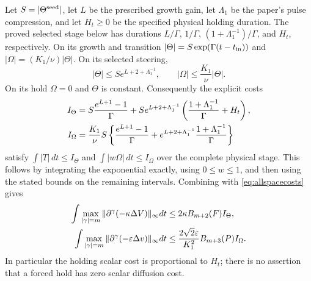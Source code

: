 Let $S=|\Theta^{\rm seed}|$, let $L$ be the prescribed growth gain,
let $\Lambda_1$ be the paper's pulse compression, and let $H_t\geq0$
be the specified physical holding duration. The proved selected stage
below has durations $L/\Gamma$, $1/\Gamma$,
$(1+\Lambda_1^{-1})/\Gamma$, and $H_t$, respectively. On its
growth and transition $|\Theta|=S\exp(\Gamma(t-t_{\rm in}))$
and $|\Omega|=(K_1/\nu)|\Theta|$. On its selected steering,
\[
 |\Theta|\leq S e^{L+2+\Lambda_1^{-1}},\qquad
 |\Omega|\leq\frac{K_1}{\nu}|\Theta|.
\]
On its hold $\Omega=0$ and $\Theta$ is constant. Consequently
the explicit costs
\begin{align}
 I_\Theta={}&S\frac{e^{L+1}-1}{\Gamma}
 +S e^{L+2+\Lambda_1^{-1}}
 \left(\frac{1+\Lambda_1^{-1}}\Gamma+H_t\right),\notag\\
 I_\Omega={}&\frac{K_1}{\nu}S\left\{
 \frac{e^{L+1}-1}{\Gamma}
 +e^{L+2+\Lambda_1^{-1}}\frac{1+\Lambda_1^{-1}}\Gamma\right\}
 \label{eq:integratedamps}
\end{align}
satisfy $\int|T|\,dt\leq I_\Theta$ and
$\int|w\Omega|\,dt\leq I_\Omega$ over the complete physical
stage. This follows by integrating the exponential exactly,
using $0\leq w\leq1$, and then using the stated bounds on the
remaining intervals. Combining with \eqref{eq:allspacecosts} gives
\begin{align}
 \int\max_{|\gamma|=m}\|\partial^\gamma(-\kappa\Delta V)\|_\infty dt
 &\leq2\kappa B_{m+2}(F)I_\Theta,\notag\\
 \int\max_{|\gamma|=m}\|\partial^\gamma(-\varepsilon\Delta v)\|_\infty dt
 &\leq\frac{2\sqrt2\varepsilon}{K_1^2}B_{m+3}(P)I_\Omega.
 \label{eq:integratedcosts}
\end{align}
In particular the holding scalar cost is proportional to $H_t$;
there is no assertion that a forced hold has zero scalar diffusion cost.

